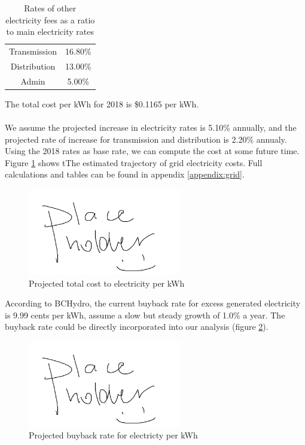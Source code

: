 \documentclass[10pt,letterpaper]{article}
\begin{document}
\begin{table}[H]
	\centering
	\begin{tabular}{|c c|}
		\hline
		Transmission&16.80\%\\
		Distribution&13.00\%\\
		Admin&5.00\%\\
		\hline
	\end{tabular}
	\caption{Rates of other electricity fees as a ratio to main electricity rates}
	\label{table:grid-fees}
\end{table}

The total cost per kWh for 2018 is \$0.1165 per kWh.\\
\\
We assume the projected increase in electricity rates is 5.10\% annually, and the projected rate of increase for transmission and distribution is 2.20\% annualy.\cite{transmission-projection} Using the 2018 rates as base rate, we can compute the cost at some future time. Figure \ref{fig:grid-projection} shows tThe estimated trajectory of grid electricity costs. Full calculations and tables can be found in appendix \ref{appendix:grid}.

\begin{figure}[H]
	\centering
	\includegraphics[width=0.6\textwidth]{assets/placeholder}
	\caption{Projected total cost to electricity per kWh}
	\label{fig:grid-projection}
\end{figure}

According to BCHydro, the current buyback rate for excess generated electricity is 9.99 cents per kWh\cite{bchydro-buyback}, assume a slow but steady growth of 1.0\% a year. The buyback rate could be directly incorporated into our analysis (figure \ref{fig:grid-buyback}).

\begin{figure}[H]
	\centering
	\includegraphics[width=0.6\textwidth]{assets/placeholder}
	\caption{Projected buyback rate for electricty per kWh}
	\label{fig:grid-buyback}
\end{figure}
\end{document}
